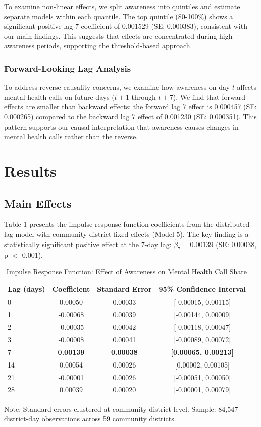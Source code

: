 \documentclass[11pt,a4paper]{article}
\begin{document}
To examine non-linear effects, we split awareness into quintiles and estimate separate models within each quantile. The top quintile (80-100\%) shows a significant positive lag 7 coefficient of 0.001529 (SE: 0.000383), consistent with our main findings. This suggests that effects are concentrated during high-awareness periods, supporting the threshold-based approach.

\subsubsection{Forward-Looking Lag Analysis}

To address reverse causality concerns, we examine how awareness on day $t$ affects mental health calls on future days ($t+1$ through $t+7$). We find that forward effects are smaller than backward effects: the forward lag 7 effect is 0.000457 (SE: 0.000265) compared to the backward lag 7 effect of 0.001230 (SE: 0.000351). This pattern supports our causal interpretation that awareness causes changes in mental health calls rather than the reverse.

\section{Results}

\subsection{Main Effects}

Table 1 presents the impulse response function coefficients from the distributed lag model with community district fixed effects (Model 5). The key finding is a statistically significant positive effect at the 7-day lag: $\hat{\beta}_7 = 0.00139$ (SE: 0.00038, p $<$ 0.001).

\begin{table}[H]
\centering
\caption{Impulse Response Function: Effect of Awareness on Mental Health Call Share}
\label{tab:irf}
\begin{tabular}{lccc}
\toprule
Lag (days) & Coefficient & Standard Error & 95\% Confidence Interval \\
\midrule
0 & 0.00050 & 0.00033 & [-0.00015, 0.00115] \\
1 & -0.00068 & 0.00039 & [-0.00144, 0.00009] \\
2 & -0.00035 & 0.00042 & [-0.00118, 0.00047] \\
3 & -0.00008 & 0.00041 & [-0.00089, 0.00072] \\
7 & \textbf{0.00139} & \textbf{0.00038} & \textbf{[0.00065, 0.00213]} \\
14 & 0.00054 & 0.00026 & [0.00002, 0.00105] \\
21 & -0.00001 & 0.00026 & [-0.00051, 0.00050] \\
28 & 0.00039 & 0.00020 & [-0.00001, 0.00079] \\
\bottomrule
\end{tabular}
\footnotesize
Note: Standard errors clustered at community district level. Sample: 84,547 district-day observations across 59 community districts.
\end{table}
\end{document}
